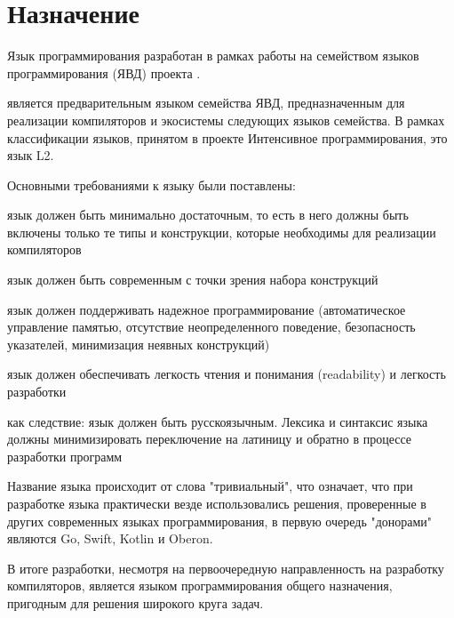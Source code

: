 \hypertarget{target}{
\section{Назначение}\label{target:chapter}}

Язык программирования \thelang{} разработан в рамках работы на семейством языков программирования \href{http://алексейнедоря.рф/?p=419}{}  (ЯВД)  проекта \href{http://digital-economy.ru/stati/интенсивное-программирование}{}.

\thelang{} является предварительным языком семейства ЯВД, предназначенным для реализации компиляторов и экосистемы следующих языков семейства. В рамках классификации языков, принятом в проекте Интенсивное программирования, это язык L2.

Основными требованиями к языку были поставлены:
\begin{d_itemize}
\item 
    язык должен быть минимально достаточным, то есть в него должны быть включены только те типы и конструкции, которые необходимы для реализации компиляторов
\item 
    язык должен быть современным с точки зрения набора конструкций
\item 
    язык должен поддерживать надежное программирование (автоматическое управление памятью, отсутствие неопределенного поведение, безопасность указателей, 
    минимизация неявных конструкций)
\item 
    язык должен обеспечивать легкость чтения и понимания (readability) и легкость разработки
\item 
    как следствие: язык должен быть русскоязычным. Лексика и синтаксис языка должны минимизировать переключение на латиницу и обратно в процессе разработки программ
\end{d_itemize}

Название языка происходит от слова "тривиальный", что означает, что при разработке языка практически везде использовались решения, проверенные в других современных языках программирования, в первую очередь "донорами" являются Go, Swift, Kotlin и Oberon.

В итоге разработки, несмотря на первоочередную направленность на разработку компиляторов, \thelang{} является
языком программирования общего назначения, пригодным для решения широкого круга задач.
 

